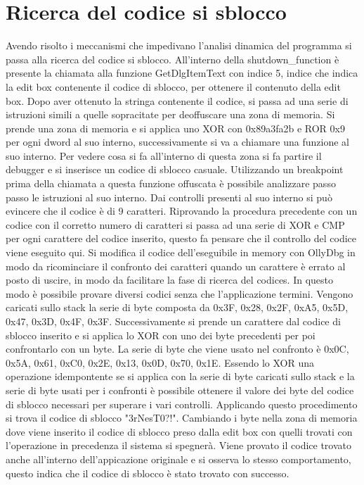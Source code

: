 \documentclass[a4paper,10pt]{article}
\begin{document}
\section{Ricerca del codice si sblocco}
Avendo risolto i meccanismi che impedivano l'analisi dinamica del programma si passa alla ricerca del codice si sblocco. All'interno della shutdown\_function è presente la chiamata alla funzione GetDlgItemText con indice 5, indice che indica la edit box contenente il codice di sblocco, per ottenere il contenuto della edit box. Dopo aver ottenuto la stringa  contenente il codice, si passa ad una serie di istruzioni simili a quelle sopracitate per deoffuscare una zona di memoria. Si prende una zona di memoria e si applica uno XOR con 0x89a3fa2b e ROR 0x9 per ogni dword al suo interno, successivamente si va a chiamare una funzione al suo interno. Per vedere cosa si fa all'interno di questa zona si fa partire il debugger e si inserisce un codice di sblocco casuale. Utilizzando un breakpoint prima della chiamata a questa funzione offuscata è possibile analizzare passo passo le istruzioni al suo interno. Dai controlli presenti al suo interno si può evincere che il codice è di 9 caratteri. Riprovando la procedura precedente con un codice con il corretto numero di caratteri si passa ad una serie di XOR e CMP per ogni carattere del codice inserito, questo fa pensare che il controllo del codice viene eseguito qui. Si modifica il codice dell'eseguibile in memory con OllyDbg in modo da ricominciare il confronto dei caratteri quando un carattere è errato al posto di uscire, in modo da facilitare la fase di ricerca del codices. In questo modo è possibile provare diversi codici senza che l'applicazione termini. Vengono caricati sullo stack la serie di byte composta da 0x3F, 0x28, 0x2F, 0xA5, 0x5D, 0x47, 0x3D, 0x4F, 0x3F. Successivamente si prende un carattere dal codice di sblocco inserito e si applica lo XOR con uno dei byte precedenti per poi confrontarlo con un byte. La serie di byte che viene usato nel confronto è 0x0C, 0x5A, 0x61, 0xC0, 0x2E, 0x13, 0x0D, 0x70, 0x1E. Essendo lo XOR una operazione idempontente se si applica con la serie di byte caricati sullo stack e la serie di byte usati per i confronti è possibile ottenere il valore dei byte del codice di sblocco necessari per superare i vari controlli. Applicando questo procedimento si trova il codice di sblocco "3rNesT0?!". Cambiando i byte nella zona di memoria dove viene inserito il codice di sblocco preso dalla edit box con quelli trovati con l'operazione in precedenza il sistema si spegnerà. Viene provato il codice trovato anche all'interno dell'appicazione originale e si osserva lo stesso comportamento, questo indica che il codice di sblocco è stato trovato con successo. 
\end{document}
